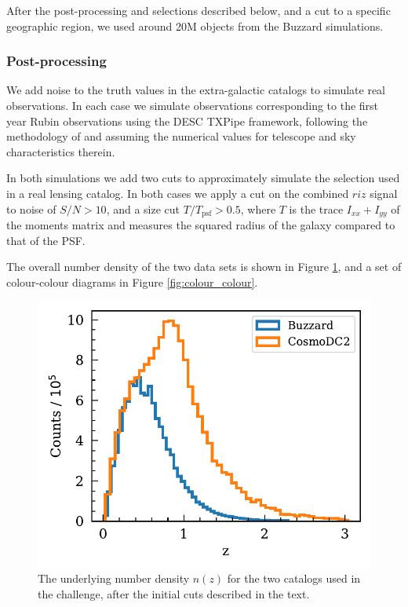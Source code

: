 \documentclass[twocolumn,twocolappendix]{aastex63}
\begin{document}
After the post-processing and selections described below, and a cut to a
specific geographic region,  we used around 20M objects from the Buzzard
simulations.


\subsubsection{Post-processing}

We add noise to the truth values in the extra-galactic catalogs to simulate real observations.
In each case we simulate observations corresponding to the first year Rubin observations
using the DESC {\sc TXPipe} framework, following the methodology of \citet{ivezic_jones_lupton}
and assuming the numerical values for telescope and sky characteristics therein.

In both simulations we add two cuts to approximately simulate the selection used in a real
lensing catalog.  In both cases we apply a cut on the combined $riz$ signal to noise of
$S/N > 10$, and a size cut $T / T_\mathrm{psf} > 0.5$, where
$T$ is the trace $I_{xx} + I_{yy}$ of the moments matrix and measures the squared radius of the
galaxy compared to that of the PSF.

The overall number density of the two data sets is shown in Figure \ref{fig:initial_nz},
and a set of colour-colour diagrams  in Figure \ref{fig:colour_colour}.

\begin{figure}[htbp]
\includegraphics[width=0.9\linewidth]{results/initial_data.pdf}
\caption{The underlying number density $n(z)$ for the two catalogs used in the challenge,
after the initial cuts described in the text.}
\label{fig:initial_nz}
\end{figure}
\end{document}
